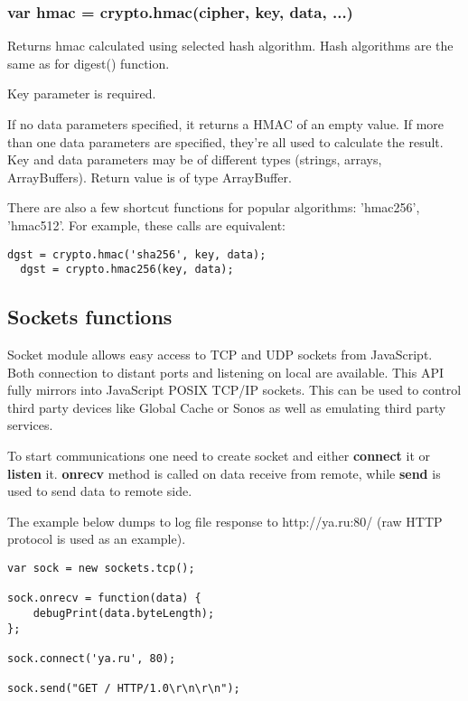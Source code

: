 \subsubsection{var hmac = crypto.hmac(cipher, key, data, ...)}
Returns hmac calculated using selected hash algorithm. Hash algorithms are the same as 
for digest() function.

Key parameter is required. 

If no data parameters specified, it returns a HMAC of an empty value. If more than one 
data parameters are specified, they're all used to calculate the result. Key and data 
parameters may be of different types (strings, arrays, ArrayBuffers).
Return value is of type ArrayBuffer.

There are also a few shortcut functions for popular algorithms: 'hmac256', 'hmac512'. For 
example, these calls are equivalent:

\begin{lstlisting}[basicstyle=\small,columns=fullflexible]
  dgst = crypto.hmac('sha256', key, data);
  dgst = crypto.hmac256(key, data);
\end{lstlisting}

\subsection{Sockets functions}

Socket module allows easy access to TCP and UDP sockets from JavaScript.
Both connection to distant ports and listening on local are available. This API fully 
mirrors into JavaScript POSIX TCP/IP sockets.
This can be used to control third party devices like Global Cache or Sonos
as well as emulating third party services.

To start communications one need to create socket and either
\textbf{connect} it or \textbf{listen} it. \textbf{onrecv} method is called
on data receive from remote, while \textbf{send} is used to send data to remote side.

The example below dumps to log file response to http://ya.ru:80/ (raw HTTP
protocol is used as an example).

\begin{lstlisting}[basicstyle=\small,columns=fullflexible]
var sock = new sockets.tcp();

sock.onrecv = function(data) {
    debugPrint(data.byteLength);
};

sock.connect('ya.ru', 80);

sock.send("GET / HTTP/1.0\r\n\r\n");
\end{lstlisting}

